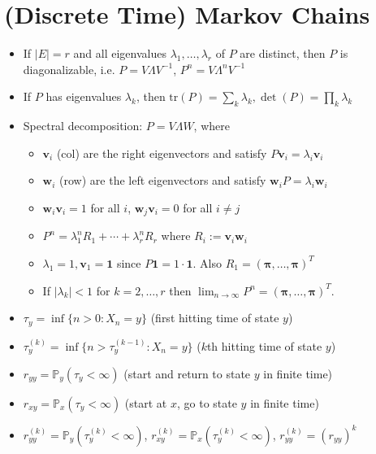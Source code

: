 \section{(Discrete Time) Markov Chains}
\begin{itemize}
    \item If $|E| = r$ and all eigenvalues $\lambda_1, \dots, \lambda_r$ of $P$ are distinct, then $P$ is diagonalizable, i.e. $P = V\Lambda V^{-1}$, $P^n = V\Lambda^n V^{-1}$
    \item If $P$ has eigenvalues $\lambda_k$, then $\text{tr}(P) = \sum_k \lambda_k, \det(P) = \prod_k \lambda_k$
    \item Spectral decomposition: $P = V\Lambda W$, where
    \begin{itemize}
        \item $\boldsymbol{v}_i$ (col) are the right eigenvectors and satisfy $P\boldsymbol{v}_i = \lambda_i \boldsymbol{v}_i$
        \item $\boldsymbol{w}_i$ (row) are the left eigenvectors and satisfy $\boldsymbol{w}_i P = \lambda_i \boldsymbol{w}_i$
        \item $\boldsymbol{w}_i\boldsymbol{v}_i = 1$ for all $i$, $\boldsymbol{w}_j\boldsymbol{v}_i = 0$ for all $i \neq j$
        \item $P^n = \lambda_1^n R_1 + \cdots + \lambda_r^n R_r$ where $R_i := \boldsymbol{v}_i\boldsymbol{w}_i$
        \item $\lambda_1 = 1, \boldsymbol{v}_1 = \boldsymbol{1}$ since $P\boldsymbol{1} = 1 \cdot \boldsymbol{1}$. Also $R_1 = (\boldsymbol{\pi}, \dots, \boldsymbol{\pi})^T$
        \item If $|\lambda_k| < 1$ for $k = 2, \dots, r$ then $\lim_{n\to\infty}P^n = (\boldsymbol{\pi}, \dots, \boldsymbol{\pi})^T$.
    \end{itemize}
    \item $\tau_y = \inf\{n > 0 : X_n = y\}$ (first hitting time of state $y$)
    \item $\tau_y^{(k)} = \inf\{n > \tau_y^{(k-1)} : X_n = y\}$ ($k$th hitting time of state $y$)
    \item $r_{yy} = \mathbb{P}_y(\tau_y < \infty)$ (start and return to state $y$ in finite time)
    \item $r_{xy} = \mathbb{P}_x(\tau_y < \infty)$ (start at $x$, go to state $y$ in finite time)
    \item $r_{yy}^{(k)} = \mathbb{P}_y(\tau_y^{(k)} < \infty)$, $r_{xy}^{(k)} = \mathbb{P}_x(\tau_y^{(k)} < \infty)$, $r_{yy}^{(k)} = (r_{yy})^k$

\end{itemize}
